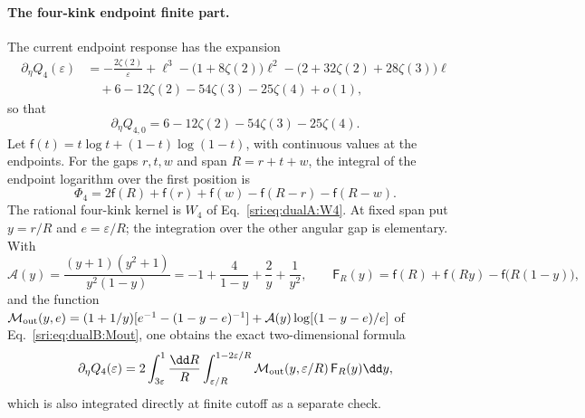 \paragraph{The four-kink endpoint finite part.} The current endpoint response has the expansion
\begin{equation}
\begin{aligned}
 \partial_\eta Q_4(\varepsilon)&=-\frac{2\zeta(2)}{\varepsilon}+\ell^3-\bigl(1+8\zeta(2)\bigr)\ell^2
 -\bigl(2+32\zeta(2)+28\zeta(3)\bigr)\ell\\
 &\quad+6-12\zeta(2)-54\zeta(3)-25\zeta(4)+o(1),
\end{aligned}
\label{sri:eq:dualB:ep4asympt}
\end{equation}
so that
\begin{equation}
 \partial_\eta Q_{4,0}=6-12\zeta(2)-54\zeta(3)-25\zeta(4).
 \label{sri:eq:dualB:ep4}
\end{equation}
Let $\mathsf f(t)=t\log t+(1-t)\log(1-t)$, with continuous values at the endpoints. For the gaps $r,t,w$ and span
$R=r+t+w$, the integral of the endpoint logarithm over the first position is
\begin{equation}
 \Phi_4=2\mathsf f(R)+\mathsf f(r)+\mathsf f(w)-\mathsf f(R-r)-\mathsf f(R-w).
\end{equation}
The rational four-kink kernel is $W_4$ of Eq.~\eqref{sri:eq:dualA:W4}. At fixed span put $y=r/R$ and $e=\varepsilon/R$;
the integration over the other angular gap is elementary. With
\begin{equation}
 \mathcal A(y)=\frac{(y+1)(y^2+1)}{y^2(1-y)}=-1+\frac4{1-y}+\frac2y+\frac1{y^2},\qquad
 \mathsf F_R(y)=\mathsf f(R)+\mathsf f(Ry)-\mathsf f\bigl(R(1-y)\bigr),
\end{equation}
and the function $\mathcal M_{\rm out}(y,e)=(1+1/y)[e^{-1}-(1-y-e)^{-1}]+\mathcal A(y)\log[(1-y-e)/e]$ of
Eq.~\eqref{sri:eq:dualB:Mout}, one obtains the exact two-dimensional formula
\begin{equation}
 \partial_\eta Q_4(\varepsilon)=2\int_{3\varepsilon}^1\frac{\dd R}{R}\int_{\varepsilon/R}^{1-2\varepsilon/R}
 \mathcal M_{\rm out}(y,\varepsilon/R)\,\mathsf F_R(y)\dd y,
 \label{sri:eq:dualB:ep4kernel}
\end{equation}
which is also integrated directly at finite cutoff as a separate check.

